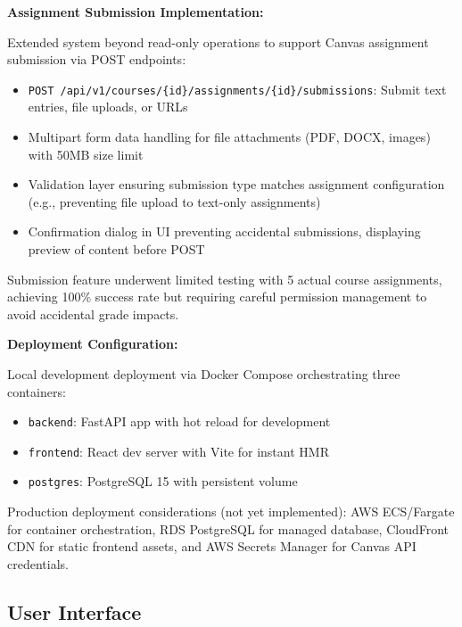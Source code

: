 \documentclass{article}
\begin{document}
\textbf{Assignment Submission Implementation:}

Extended system beyond read-only operations to support Canvas assignment submission via POST endpoints:

\begin{itemize}

\item \texttt{POST /api/v1/courses/\{id\}/assignments/\{id\}/submissions}: Submit text entries, file uploads, or URLs

\item Multipart form data handling for file attachments (PDF, DOCX, images) with 50MB size limit

\item Validation layer ensuring submission type matches assignment configuration (e.g., preventing file upload to text-only assignments)

\item Confirmation dialog in UI preventing accidental submissions, displaying preview of content before POST

\end{itemize}

Submission feature underwent limited testing with 5 actual course assignments, achieving 100\% success rate but requiring careful permission management to avoid accidental grade impacts.

\textbf{Deployment Configuration:}

Local development deployment via Docker Compose orchestrating three containers:

\begin{itemize}

\item \texttt{backend}: FastAPI app with hot reload for development

\item \texttt{frontend}: React dev server with Vite for instant HMR

\item \texttt{postgres}: PostgreSQL 15 with persistent volume

\end{itemize}

Production deployment considerations (not yet implemented): AWS ECS/Fargate for container orchestration, RDS PostgreSQL for managed database, CloudFront CDN for static frontend assets, and AWS Secrets Manager for Canvas API credentials.

\subsection{User Interface}
\end{document}
